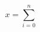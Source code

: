 \documentclass[a4paper,11pt]{article}
\date{}
\begin{document}
\begin{equation}
\displaystyle x  =  \sum _{i = 0} ^{n} 
\end{equation}
\end{document}
